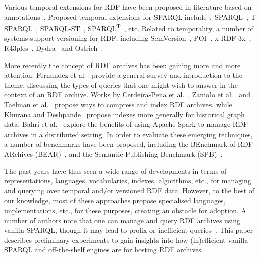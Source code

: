 \documentclass{llncs}
\begin{document}
Various temporal extensions for RDF have been proposed in literature based on annotations~\cite{GutierrezHV07,PuglieseUS08,ZimmermannLPS12}. Proposed temporal extensions for SPARQL include $\tau$-SPARQL~\cite{TappoletB09}, T-SPARQL~\cite{Grandi10}, SPARQL-ST~\cite{PerryJS11}, SPARQL\textsuperscript{T}~\cite{ZanioloGACG18}, etc. Related to temporality, a number of systems support versioning for RDF, including SemVersion~\cite{VolkelG06}, POI~\cite{TzitzikasTA08}, x-RDF-3x~\cite{NeumannW10}, R43ples~\cite{GraubeHU14}, Dydra~\cite{AndersonB16} and Ostrich~\cite{TaelmanSV18}.

More recently the concept of RDF archives has been gaining more and more attention. Fernandez et al.~\cite{FernandezPU15} provide a general survey and introduction to the theme, discussing the types of queries that one might wish to answer in the context of an RDF archive. Works by Cerdeira{-}Pena et al.~\cite{Cerdeira-PenaFF16}, Zaniolo et al.~\cite{ZanioloGACG18} and Taelman et al.~\cite{TaelmanSHMV19} propose ways to compress and index RDF archives, while Khurana and Deshpande~\cite{KhuranaD16} propose indexes more generally for historical graph data. Bahri et al.~\cite{BahriLA18} explore the benefits of using Apache Spark to manage RDF archives in a distributed setting. In order to evaluate these emerging techniques, a number of benchmarks have been proposed, including the BEnchmark of RDF
ARchives (BEAR)~\cite{FernandezUPK19}, and the Semantic Publishing Benchmark (SPB)~\cite{Papakonstantinou18}.

The past years have thus seen a wide range of developments in terms of representations, languages, vocabularies, indexes, algorithms, etc., for managing and querying over temporal and/or versioned RDF data. However, to the best of our knowledge, most of these approaches propose specialised languages, implementations, etc., for these purposes, creating an obstacle for adoption. %
A number of authors note that one can manage and query RDF archives using vanilla SPARQL, though it may lead to prolix or inefficient queries~\cite{TappoletB09,FernandezUPK19}. This paper describes preliminary experiments to gain insights into how (in)efficient vanilla SPARQL and off-the-shelf engines are for hosting RDF archives.
\end{document}
